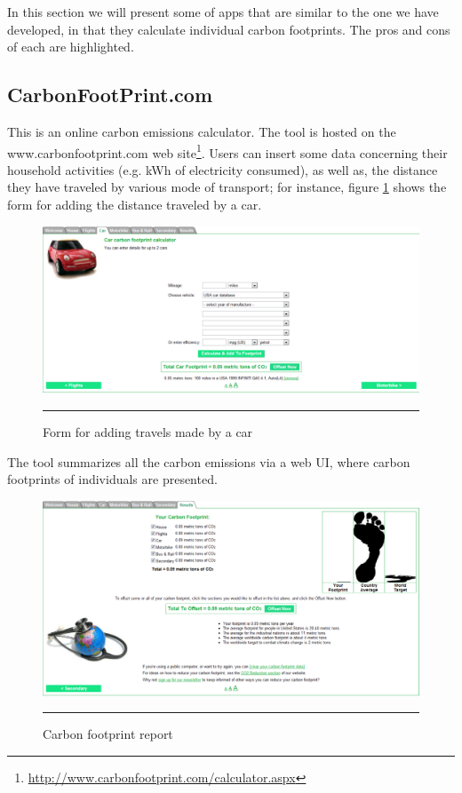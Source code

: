 In this section we will present some of apps that are similar to the one we have developed, in that they calculate individual carbon footprints. The pros and cons of each are highlighted.

\subsection{CarbonFootPrint.com}

This is an online carbon emissions calculator. The tool is hosted on the www.carbonfootprint.com web site\footnote{\url{http://www.carbonfootprint.com/calculator.aspx}}.
Users can insert some data concerning their household activities (e.g. kWh of electricity consumed), as well as, the distance they have traveled by various mode of transport; for instance, figure \ref{fig:carbonFootprintCom} shows the form for adding the distance traveled by a car.

\begin{figure}[htbp]
	\centering
		\includegraphics[scale=0.30]{./Figures/chapter2/figure18.pdf}
		\rule{35em}{0.5pt}
	\caption[Form for adding travels made by a car]{Form for adding travels made by a car}
	\label{fig:carbonFootprintCom}
\end{figure}

The tool summarizes all the carbon emissions via a web UI, where carbon footprints of individuals are presented.

\begin{figure}[htbp]
	\centering
		\includegraphics[scale=0.30]{./Figures/chapter2/figure19.pdf}
		\rule{35em}{0.5pt}
	\caption[Carbon footprint report]{Carbon footprint report}
	\label{fig:carbonFootprintCom2}
\end{figure}

